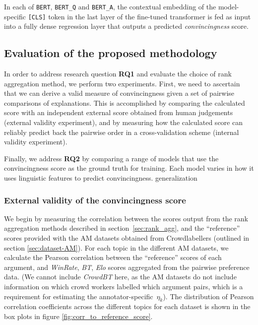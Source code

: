 \documentclass[notitlepage,12pt]{jedm}
\begin{document}
In each of \verb|BERT|, \verb|BERT_Q| and \verb|BERT_A|, the contextual 
embedding of the model-specific \verb|[CLS]| token in the last layer of the 
fine-tuned transformer is fed as input into a fully dense regression layer
that outputs a predicted \textit{convincingness} score.

 
\subsection{Evaluation of the proposed methodology}\label{sec:methodology_eval}

In order to address research question \textbf{RQ1} and evaluate the choice of rank
aggregation method, we perform two experiments.  First, we need to
ascertain that we can derive a valid measure of convincingness given a set of pairwise
comparisons of explanations.  This is accomplished by comparing the calculated score with an
independent external score obtained from human judgements (external validity experiment),
and by measuring how the calculated score can reliably predict back the pairwise order
in a cross-validation scheme (internal validity experiment).

Finally, we address \textbf{RQ2} by comparing a range of models that use the
convincingness score as the ground truth for training.  Each model varies in how it uses
linguistic features to predict convincingness.  
generalization

\subsubsection{External validity of the convincingness score}
We begin by measuring the correlation between the scores output from the rank 
aggregation methods described in section~\ref{sec:rank_agg}, and the 
``reference'' scores provided with the AM datasets obtained from Crowdlabellers (outlined in section \ref{sec:dataset-AM}).
For each topic in the different AM datasets, we calculate the Pearson 
correlation between the ``reference'' scores of each argument, and 
\textit{WinRate}, \textit{BT}, \textit{Elo} scores aggregated from the pairwise 
preference data. (We cannot include \textit{CrowdBT} here, as the AM datasets 
do not include information on which crowd workers labelled which argument 
pairs, which is a requirement for estimating the annotator-specific~$\eta_k$).
The distribution of Pearson correlation coefficients across the different 
topics for each dataset is shown in the box plots in figure 
\ref{fig:corr_to_reference_score}.
\end{document}

